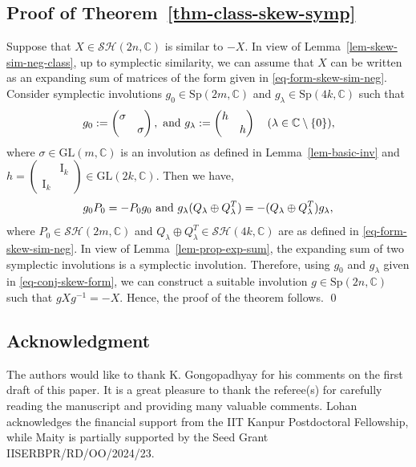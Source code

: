 \documentclass[11pt,reqno]{amsart}
\numberwithin{equation}{section}
\theoremstyle{definition}
\def\C{\mathbb C}
\def\C{\mathbb {C}}
\newcommand{\thmref}[1]{Theorem~\ref{#1}}
\newcommand{\lemref}[1]{Lemma~\ref{#1}}
\begin{document}
\subsection{Proof of \thmref{thm-class-skew-symp}} Suppose that $X \in \mathcal{SH}(2n,\C)$ is similar to $-X$. In view of \lemref{lem-skew-sim-neg-class}, up to symplectic similarity, we can assume that $X$ can be written as an expanding sum of matrices of the form given in \eqref{eq-form-skew-sim-neg}. Consider symplectic involutions $g_{0} \in \mathrm{Sp}(2m, \C)$ and $g_{\lambda} \in \mathrm{Sp}(4k, \C)$  such that
\begin{equation}\label{eq-conj-skew-form}
	g_{0} :=  \begin{pmatrix}
		\sigma & \\
		&  \sigma 
	\end{pmatrix}, \hbox{ and } g_{\lambda}:=  \begin{pmatrix}
		h & \\
		& h
	\end{pmatrix} \quad (\lambda \in \C \setminus \{0\}), 
\end{equation}
where $\sigma \in \mathrm{GL}(m,\C)$ is an involution as defined in \lemref{lem-basic-inv} and $h=  \begin{pmatrix}
	&  \mathrm{I}_{k}\\
	\mathrm{I}_{k} 	& 
\end{pmatrix} \in \mathrm{GL}(2k,\C)$. Then we have,
\begin{equation*}
	g_{0} P_{0}  = - P_{0} g_{0} \hbox{ and } g_{\lambda} (Q_{\lambda}\oplus Q_{\lambda}^{T})  = - (Q_{\lambda}\oplus Q_{\lambda}^{T}) g_{\lambda}, 
\end{equation*}
where $P_{0}  \in \mathcal{SH}(2m,\C) $ and $Q_{\lambda}\oplus Q_{\lambda}^{T}  \in \mathcal{SH}(4k,\C) $ are as defined in \eqref{eq-form-skew-sim-neg}.  In view of \lemref{lem-prop-exp-sum}, the expanding sum of two symplectic involutions is a symplectic involution. Therefore,  using  $g_{0}$ and $g_{\lambda}$ given in \eqref{eq-conj-skew-form}, we can construct a suitable involution $g \in \mathrm{Sp}(2n,\mathbb{C})$ such that $gXg^{-1} = -X$.  Hence, the proof of the theorem follows.
\qed


\subsection*{Acknowledgment}  The authors would like to thank K. Gongopadhyay for his comments on the first draft of this paper. It is a great pleasure to thank the referee(s) for carefully reading the manuscript and providing many valuable comments. Lohan acknowledges the financial support from the IIT Kanpur Postdoctoral Fellowship, while  Maity is partially supported by the Seed Grant IISERBPR/RD/OO/2024/23.
\end{document}
